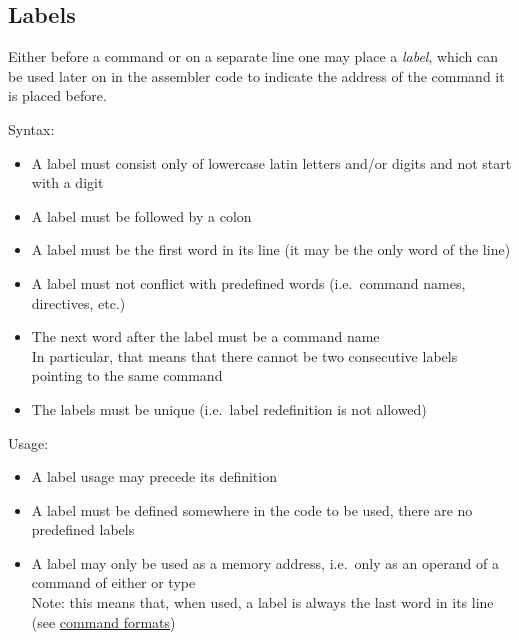 \subsection{Labels}

Either before a command or on a separate line one may place a \textit{label},
which can be used later on in the assembler code to indicate the address of
the command it is placed before.

Syntax:

\begin{itemize}
    \item A label must consist only of lowercase latin letters and/or digits
    and not start with a digit

    \item A label must be followed by a colon

    \item A label must be the first word in its line
    (it may be the only word of the line)

    \item A label must not conflict with predefined words
    (i.e.\ command names, directives, etc.)

    \item The next word after the label must be a command name\\
    In particular, that means that there cannot be two consecutive
    labels pointing to the same command

    \item The labels must be unique (i.e.\ label redefinition is not allowed)
\end{itemize}

Usage:

\begin{itemize}
    \item A label usage may precede its definition

    \item A label must be defined somewhere in the code to be used,
    there are no predefined labels

    \item A label may only be used as a memory address, i.e.\ only as
    an operand of a command of either  or  type \\
    Note: this means that, when used, a label is always the last word in
    its line (see \hyperlink{command:formats}{command formats})
\end{itemize}

